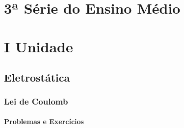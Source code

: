 \documentclass[12pt,a4paper]{book}
\begin{document}
\part{3ª Série do Ensino Médio}


\part*{I Unidade}
\chapter{Eletrostática}

	\section{Lei de Coulomb}
		\newpage \subsection{Problemas e Exercícios}
	
\end{document}
